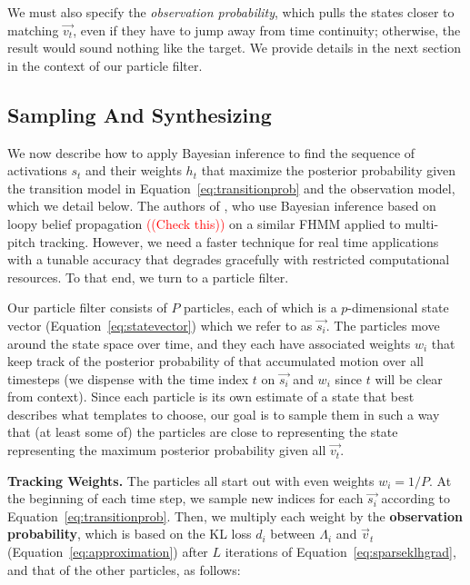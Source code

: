 \documentclass{article}
\newcommand{\ChrisEdit}[1]{\textcolor{red}{(#1)}}
\begin{document}
    We must also specify the {\em observation probability}, which pulls the states closer to matching $\vec{v_t}$, even if they have to jump away from time continuity; otherwise, the result would sound nothing like the target. We provide details in the next section in the context of our particle filter.



\subsection{Sampling  And Synthesizing}
\label{sec:sampling}

We now describe how to apply Bayesian inference to find the sequence of activations $s_t$ and their weights $h_t$ that maximize the posterior probability given the transition model in Equation~\ref{eq:transitionprob} and the observation model, which we detail below.  The authors of \cite{wohlmayr2010probabilistic}, who use Bayesian inference based on loopy belief propagation \ChrisEdit{(Check this)} on a similar FHMM applied to multi-pitch tracking.  However, we need a faster technique for real time applications with a tunable accuracy that degrades gracefully with restricted computational resources.  To that end, we turn to a particle filter.  

Our particle filter consists of $P$ particles, each of which is a $p$-dimensional state vector (Equation~\ref{eq:statevector}) which we refer to as $\vec{s_i}$.  The particles move around the state space over time, and they each have associated weights $w_i$ that keep track of the posterior probability of that accumulated motion over all timesteps (we dispense with the time index $t$ on $\vec{s_i}$ and $w_i$ since $t$ will be clear from context).  Since each particle is its own estimate of a state that best describes what templates to choose, our goal is to sample them in such a way that (at least some of) the particles are close to representing the state representing the maximum posterior probability given all $\vec{v_t}$.

\textbf{Tracking Weights.} The particles all start out with even weights $w_i = 1/P$.  At the beginning of each time step, we sample new indices for each $\vec{s_i}$ according to Equation~\ref{eq:transitionprob}.  Then, we multiply each weight by the \textbf{observation probability}, which is based on the KL loss $d_i$ between $\Lambda_i$ and $\vec{v}_t$ (Equation~\ref{eq:approximation}) after $L$ iterations of Equation~\ref{eq:sparseklhgrad}, and that of the other particles, as follows:
\end{document}
